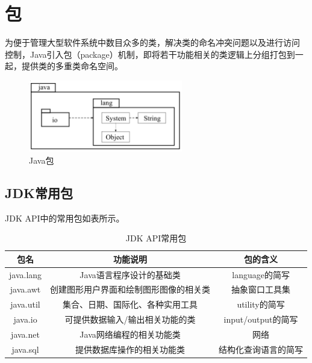 \section{包}
为便于管理大型软件系统中数目众多的类，解决类的命名冲突问题以及进行访问
控制，Java引入包（package）机制，即将若干功能相关的类逻辑上分组打包到一
起，提供类的多重类命名空间。

\begin{figure}[htb]
\centering
\includegraphics[width=0.6\textwidth]{images/Advanced-object-oriented-programming-1/fig-java-package.pdf}
\caption{Java包}
\label{fig:java-package}
\end{figure}

\subsection{JDK常用包}

JDK API中的常用包如表所示。

\begin{table}[!htbp]
  \centering
  \caption{JDK API常用包}
  \label{tab:java-package-list}
  \begin{tabular}{|c|c|c|}
    \hline
    {\bf 包名} & {\bf 功能说明} & {\bf 包的含义}   \\
    \hline
    java.lang & Java语言程序设计的基础类 & language的简写\\
    \hline
    java.awt & 创建图形用户界面和绘制图形图像的相关类 & 抽象窗口工具集\\
    \hline
    java.util & 集合、日期、国际化、各种实用工具 & utility的简写\\
    \hline
    java.io & 可提供数据输入/输出相关功能的类 & input/output的简写\\
    \hline
    java.net & Java网络编程的相关功能类 & 网络\\
    \hline
    java.sql & 提供数据库操作的相关功能类 & 结构化查询语言的简写\\
    \hline
  \end{tabular}
\end{table}


